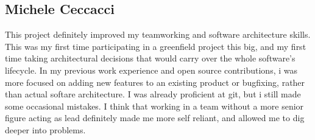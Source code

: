 \subsection{Michele Ceccacci}
This project definitely improved my teamworking and software architecture skills. 
This was my first time participating in a greenfield project this big, and my first time 
taking architectural decisions that would carry over the whole software's lifecycle. 
In my previous work experience and open source contributions, i was more focused on  adding new features 
to an existing product or bugfixing, rather than actual softare architecture.
I was already proficient at git, but i still made some occasional mistakes.
I think that working in a team without a more senior figure acting as lead definitely 
made me more self reliant, and allowed me to dig deeper into problems.
